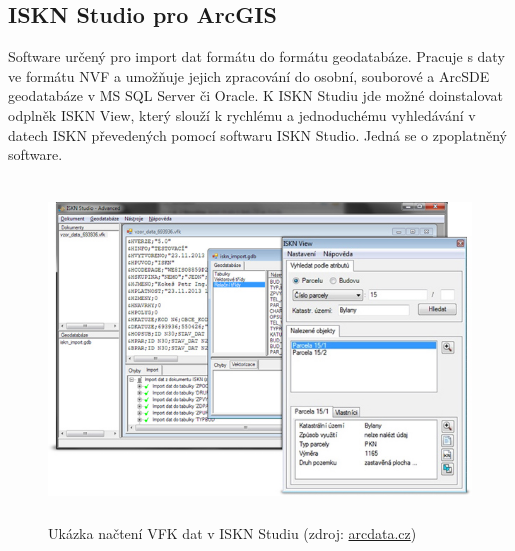 \subsection{ISKN Studio pro ArcGIS}
Software určený pro import dat formátu  do formátu geodatabáze. Pracuje s daty ve formátu NVF a umožňuje jejich zpracování do osobní, souborové a ArcSDE geodatabáze v MS SQL Server či Oracle. K ISKN Studiu jde možné doinstalovat odplněk ISKN View, který slouží k rychlému a jednoduchému vyhledávání v datech ISKN převedených pomocí softwaru ISKN Studio. Jedná se o zpoplatněný software. \cite{arcgis}

\begin{figure}[H]
	 \centering
      \includegraphics[height=9cm]{./pictures/iskn_studio.jpeg}
      \caption{Ukázka načtení VFK dat v ISKN Studiu (zdroj:
\href{https://www.arcdata.cz/uploads/media/general/0001/01/68f0bfd90cf19d903a57fc8457e1f228a7dd47f4.jpeg}{arcdata.cz})}
      \label{fig:iskn studio}
  \end{figure}
